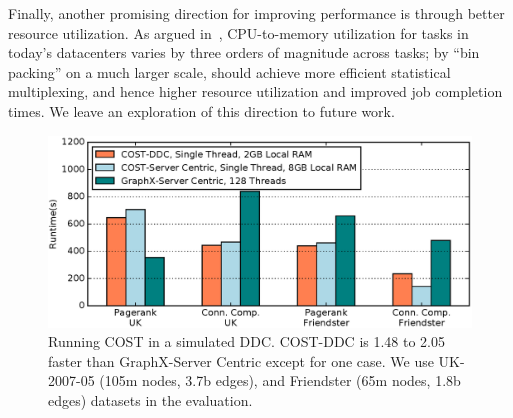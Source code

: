 Finally, another promising direction for improving performance is through better resource utilization. As argued in~\cite{hotnets, ddcHwDesign1}, CPU-to-memory utilization for tasks in today’s datacenters varies by three orders of magnitude across tasks; by ``bin packing'' on a much larger scale, \dis should achieve more efficient statistical multiplexing, and hence higher resource utilization and improved job completion times. We leave an exploration of this direction to future work. 


\begin{figure}
  \centering
    \includegraphics[width = \columnwidth]{img/benefit_uk.eps} 
  \caption{\small{Running COST in a simulated DDC. COST-DDC is 1.48 to 2.05 faster than GraphX-Server Centric except for one case. We use UK-2007-05 (105m nodes, 3.7b edges), and Friendster (65m nodes, 1.8b edges) datasets in the evaluation.}}
  \label{fig:benefit}
\end{figure}
